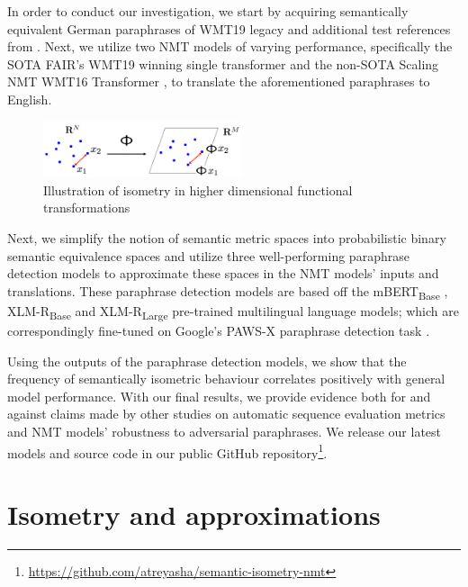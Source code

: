 \documentclass[11pt,a4paper]{article}
\begin{document}
In order to conduct our investigation, we start by acquiring semantically equivalent German paraphrases of WMT19 legacy and additional test references from \citet{freitag-bleu-paraphrase-references-2020}. Next, we utilize two NMT models of varying performance, specifically the SOTA FAIR's WMT19 winning single transformer \cite{ng2019facebook} and the non-SOTA Scaling NMT WMT16 Transformer \cite{ott2018scaling}, to translate the aforementioned paraphrases to English.

\begin{figure}
  \centering
  \includegraphics[trim={0cm 0cm 0cm 0cm},clip,width=0.52\textwidth]{isometry_visualized.png}
  \caption{Illustration of isometry in higher dimensional functional transformations \citep{Hegde-Numax}}
  \label{isometry_visual}
\end{figure}

Next, we simplify the notion of semantic metric spaces into probabilistic binary semantic equivalence spaces and utilize three well-performing paraphrase detection models to approximate these spaces in the NMT models' inputs and translations. These paraphrase detection models are based off the mBERT\textsubscript{Base} \cite{devlin-etal-2019-bert}, XLM-R\textsubscript{Base} \cite{conneau2019unsupervised} and XLM-R\textsubscript{Large} \cite{conneau2019unsupervised} pre-trained multilingual language models; which are correspondingly fine-tuned on Google's PAWS-X paraphrase detection task \cite{pawsx2019emnlp, hu2020xtreme}.
 
Using the outputs of the paraphrase detection models, we show that the frequency of semantically isometric behaviour correlates positively with general model performance. With our final results, we provide evidence both for and against claims made by other studies on automatic sequence evaluation metrics and NMT models' robustness to adversarial paraphrases. We release our latest models and source code in our public GitHub repository\footnote{\url{https://github.com/atreyasha/semantic-isometry-nmt}}.

\section{Isometry and approximations}
\end{document}
